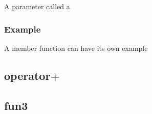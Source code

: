 \documentclass[letterpaper,10pt,english]{sphinxmanual}
\begin{document}
\begin{DUlineblock}{0em}
\item[]  \sphinxhyphen{} A parameter called a
\end{DUlineblock}
\subsubsection*{Example}

A member function can have its own example


\subsection{operator+}
\label{\detokenize{style-guide/ClassExample:operator}}

\subsection{fun3}
\label{\detokenize{style-guide/ClassExample:fun3}}
\end{document}
